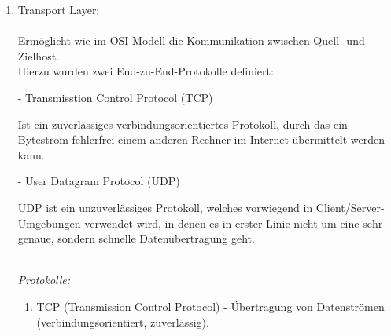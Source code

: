 \documentclass[11pt]{article}
\begin{document}
\begin{enumerate}
\begin{addmargin}[1em]{1em}
\begin{enumerate}
                \item Z39.50 - Abfrage von Informationssystemen\\

            \end{enumerate}
        \end{addmargin}


        \item Transport Layer:\\\\
        Ermöglicht wie im OSI-Modell die Kommunikation zwischen Quell- und Zielhost.\\
        Hierzu wurden zwei End-zu-End-Protokolle definiert:\\

        \begin{addmargin}[1em]{1em}

            - Transmisstion Control Protocol (TCP)\\
            \begin{addmargin}[1em]{1em}

                Ist ein zuverlässiges verbindungsorientiertes Protokoll, durch das
                ein Bytestrom fehlerfrei einem anderen Rechner im Internet übermittelt
                werden kann.\\

            \end{addmargin}
            - User Datagram Protocol (UDP)\\
            \begin{addmargin}[1em]{1em}

                UDP ist ein unzuverlässiges Protokoll, welches vorwiegend in Client/Server-
                Umgebungen verwendet wird, in denen es in erster Linie nicht um eine sehr genaue,
                sondern schnelle Datenübertragung geht.\\\\

            \end{addmargin}

            \emph{Protokolle:}\\
            \begin{enumerate}

                \item TCP (Transmission Control Protocol) - Übertragung von Datenströmen
                (verbindungsorientiert, zuverlässig).\\


\end{enumerate}
\end{addmargin}
\end{enumerate}
\end{document}
